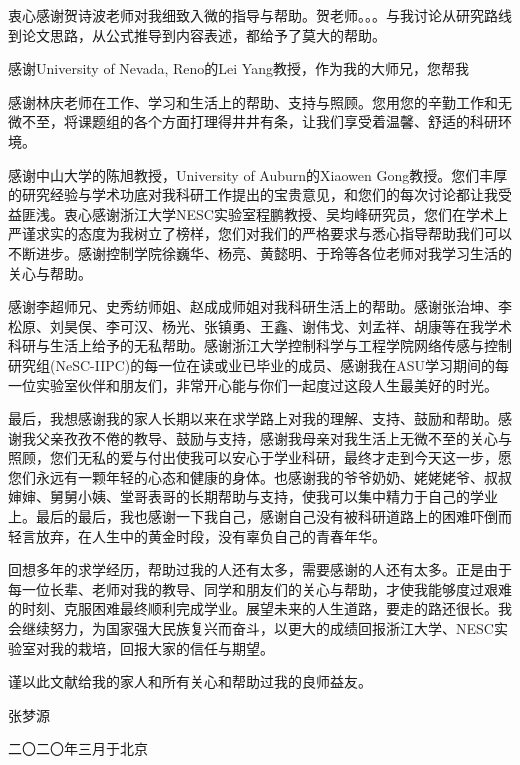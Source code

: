 \begin{thanks}
衷心感谢贺诗波老师对我细致入微的指导与帮助。贺老师。。。与我讨论从研究路线到论文思路，从公式推导到内容表述，都给予了莫大的帮助。

感谢University of Nevada, Reno的Lei Yang教授，作为我的大师兄，您帮我


感谢林庆老师在工作、学习和生活上的帮助、支持与照顾。您用您的辛勤工作和无微不至，将课题组的各个方面打理得井井有条，让我们享受着温馨、舒适的科研环境。

感谢中山大学的陈旭教授，University of Auburn的Xiaowen Gong教授。您们丰厚的研究经验与学术功底对我科研工作提出的宝贵意见，和您们的每次讨论都让我受益匪浅。衷心感谢浙江大学NESC实验室程鹏教授、吴均峰研究员，您们在学术上严谨求实的态度为我树立了榜样，您们对我们的严格要求与悉心指导帮助我们可以不断进步。感谢控制学院徐巍华、杨亮、黄懿明、于玲等各位老师对我学习生活的关心与帮助。

感谢李超师兄、史秀纺师姐、赵成成师姐对我科研生活上的帮助。感谢张治坤、李松原、刘昊俣、李可汉、杨光、张镇勇、王鑫、谢伟戈、刘孟祥、胡康等在我学术科研与生活上给予的无私帮助。感谢浙江大学控制科学与工程学院网络传感与控制研究组(NeSC-IIPC)的每一位在读或业已毕业的成员、感谢我在ASU学习期间的每一位实验室伙伴和朋友们，非常开心能与你们一起度过这段人生最美好的时光。


最后，我想感谢我的家人长期以来在求学路上对我的理解、支持、鼓励和帮助。感谢我父亲孜孜不倦的教导、鼓励与支持，感谢我母亲对我生活上无微不至的关心与照顾，您们无私的爱与付出使我可以安心于学业科研，最终才走到今天这一步，愿您们永远有一颗年轻的心态和健康的身体。也感谢我的爷爷奶奶、姥姥姥爷、叔叔婶婶、舅舅小姨、堂哥表哥的长期帮助与支持，使我可以集中精力于自己的学业上。最后的最后，我也感谢一下我自己，感谢自己没有被科研道路上的困难吓倒而轻言放弃，在人生中的黄金时段，没有辜负自己的青春年华。


回想多年的求学经历，帮助过我的人还有太多，需要感谢的人还有太多。正是由于每一位长辈、老师对我的教导、同学和朋友们的关心与帮助，才使我能够度过艰难的时刻、克服困难最终顺利完成学业。展望未来的人生道路，要走的路还很长。我会继续努力，为国家强大民族复兴而奋斗，以更大的成绩回报浙江大学、NESC实验室对我的栽培，回报大家的信任与期望。

谨以此文献给我的家人和所有关心和帮助过我的良师益友。

	\begin{flushright}
		{张梦源}
		
		{二〇二〇年三月于北京}
	\end{flushright}
\end{thanks}
